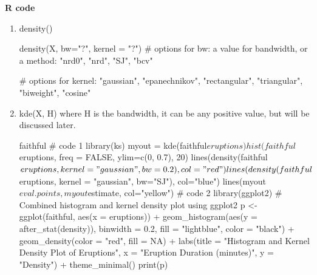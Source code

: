 \documentclass[19pt,landscape]{article}
\DeclareMathOperator{\E}{\mathbb{E}}
\begin{document}
\newpage
{\LARGE\centerline{\textbf{R code}}}
\vskip15pt
    \Large
\begin{enumerate}
\item density()
\begin{Sinput}
density(X, bw="?",  kernel = "?")
# options for bw: a value for bandwidth, or a method:
"nrd0", "nrd", "SJ", "bcv"
    
# options for kernel: "gaussian", "epanechnikov",
"rectangular", "triangular", "biweight", "cosine"
    
\end{Sinput}
\item kde(X, H) where H is the bandwidth, it can be any positive value, but will be discussed later.
\begin{Schunk}
\begin{Sinput}
faithful
# code 1
library(ks)
myout = kde(faithful$eruptions)
hist(faithful$eruptions, freq = FALSE, ylim=c(0, 0.7), 20)
lines(density(faithful$eruptions, kernel = "gaussian",
bw=0.2), col="red")
lines(density(faithful$eruptions, kernel = "gaussian",
bw="SJ"), col="blue")
lines(myout$eval.points, myout$estimate, col="yellow")
# code 2
library(ggplot2)
# Combined histogram and kernel density plot using ggplot2
p <- ggplot(faithful, aes(x = eruptions)) +
geom_histogram(aes(y = after_stat(density)), binwidth = 0.2,
 fill = "lightblue", color = "black") +
geom_density(color = "red", fill = NA) +
labs(title = "Histogram and Kernel Density Plot of Eruptions",
       x = "Eruption Duration (minutes)",
       y = "Density") +
  theme_minimal()
print(p)
\end{Sinput}
\end{Schunk}
\end{enumerate}
\end{document}
